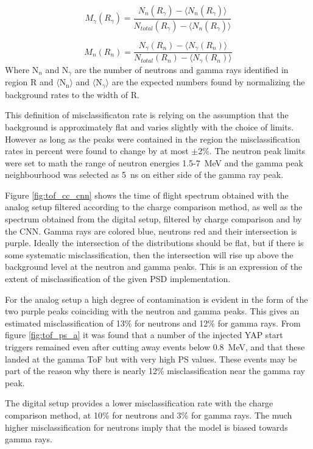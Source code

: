 \documentclass[main.tex]{subfiles}
\begin{document}
\begin{equation}
	M_\gamma(R_\gamma) = \frac{N_{n}(R_\gamma)-\langle N_n(R_\gamma)\rangle}{N_{total}(R_\gamma)-\langle N_n(R_\gamma)\rangle}
\end{equation}

\begin{equation}
	M_n(R_n) = \frac{N_{\gamma}(R_n)-\langle N_\gamma(R_n)\rangle}{N_{total}(R_n)-\langle N_\gamma(R_n)\rangle}
\end{equation}
Where N$_n$ and N$_\gamma$ are the number of neutrons and gamma rays identified in region R and $\langle \textrm{N}_\textrm{n}\rangle$ and $\langle \textrm{N}_\gamma\rangle$ are the expected numbers found by normalizing the background rates to the width of R.

This definition of misclassificaton rate is relying on the assumption that the background is approximately flat and varies slightly with the choice of limits. However as long as the peaks were contained in the region the misclassification rates in percent were found to change by at most $\pm$2\%. The neutron peak limits were set to math the range of neutron energies 1.5-\SI{7}{\MeV} and the gamma peak neighbourhood was selected as \SI{5}{\ns} on either side of the gamma ray peak.

Figure \ref{fig:tof_cc_cnn} shows the time of flight spectrum obtained with the analog setup filtered according to the charge comparison method, as well as the spectrum obtained from the digital setup, filtered by charge comparison and by the CNN. Gamma rays are colored blue, neutrons red and their intersection is purple. Ideally the intersection of the distributions should be flat, but if there is some systematic misclassification, then the intersection will rise up above the background level at the neutron and gamma peaks. This is an expression of the extent of misclassification of the given PSD implementation.

For the analog setup a high degree of contamination is evident in the form of the two purple peaks coinciding with the neutron and gamma peaks. This gives an estimated misclassification of 13\% for neutrons and 12\% for gamma rays. From figure \ref{fig:tof_ps_a} it was found that a number of the injected YAP start triggers remained even after cutting away events below \SI{0.8}{\MeV}, and that these landed at the gamma ToF but with very high PS values. These events may be part of the reason why there is nearly 12\% misclassification near the gamma ray peak.

The digital setup provides a lower misclassification rate with the charge comparison method, at 10\% for neutrons and 3\% for gamma rays. The much higher misclassification for neutrons imply that the model is biased towards gamma rays.
\end{document}
